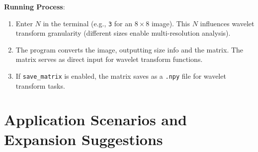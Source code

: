 \documentclass[12pt,a4paper]{article}
\begin{document}


\textbf{Running Process}:  
\begin{enumerate}
    \item Enter \(N\) in the terminal (e.g., \texttt{3} for an \(8 \times 8\) image). This \(N\) influences wavelet transform granularity (different sizes enable multi-resolution analysis).  
    \item The program converts the image, outputting size info and the matrix. The matrix serves as direct input for wavelet transform functions.  
    \item If \texttt{save\_matrix} is enabled, the matrix saves as a \texttt{.npy} file for wavelet transform tasks.  
\end{enumerate}


\section{Application Scenarios and Expansion Suggestions}
\end{document}
